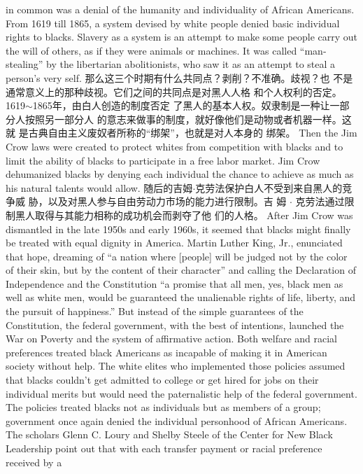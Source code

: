 \begin{paracol}{2}
in common was a denial of the humanity and individuality of
African Americans. From 1619 till 1865, a system devised by
white people denied basic individual rights to blacks. Slavery as
a system is an attempt to make some people carry out the will
of others, as if they were animals or machines. It was called
``man-stealing'' by the libertarian abolitionists, who saw it as an
attempt to steal a person's very self.
\switchcolumn
那么这三个时期有什么共同点？剥削？不准确。歧视？也
不是通常意义上的那种歧视。它们之间的共同点是对黑人人格
和个人权利的否定。1619$\sim$1865年，由白人创造的制度否定
了黑人的基本人权。奴隶制是一种让一部分人按照另一部分人
的意志来做事的制度，就好像他们是动物或者机器一样。这就
是古典自由主义废奴者所称的“绑架”，也就是对人本身的
绑架。
\switchcolumn*
Then the Jim Crow laws were created to protect whites from
competition with blacks and to limit the ability of blacks to
participate in a free labor market. Jim Crow dehumanized
blacks by denying each individual the chance to achieve as
much as his natural talents would allow.
\switchcolumn
随后的吉姆$\cdot$克劳法保护白人不受到来自黑人的竞争威
胁，以及对黑人参与自由劳动力市场的能力进行限制。吉 姆 $\cdot$
克劳法通过限制黑人取得与其能力相称的成功机会而剥夺了他
们的人格。
\switchcolumn*
After Jim Crow was dismantled in the late 1950s and early
1960s, it seemed that blacks might finally be treated with equal
dignity in America. Martin Luther King, Jr., enunciated that
hope, dreaming of ``a nation where [people] will be judged not
by the color of their skin, but by the content of their character''
and calling the Declaration of Independence and the Constitution ``a promise that all men, yes, black men as well as white
men, would be guaranteed the unalienable rights of life, liberty,
and the pursuit of happiness.'' But instead of the simple guarantees of the Constitution, the federal government, with the best of intentions, launched the War on Poverty and the system
of affirmative action. Both welfare and racial preferences
treated black Americans as incapable of making it in American
society without help. The white elites who implemented those
policies assumed that blacks couldn't get admitted to college or
get hired for jobs on their individual merits but would need the
paternalistic help of the federal government. The policies
treated blacks not as individuals but as members of a group;
government once again denied the individual personhood of
African Americans. The scholars Glenn C. Loury and Shelby
Steele of the Center for New Black Leadership point out that
with each transfer payment or racial preference received by a

\end{paracol}
